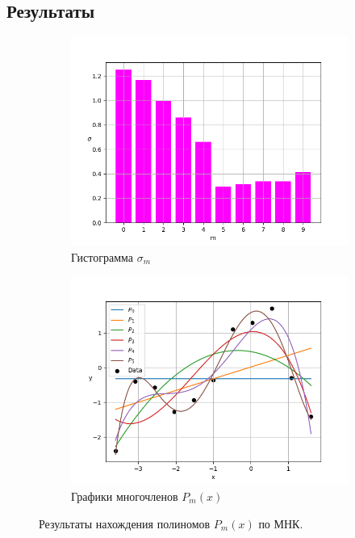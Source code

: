 \documentclass[12pt]{article}%
\begin{document}
\newpage
\subsection{Результаты}
\begin{figure}[!h]
\centering

\begin{subfigure}{0.49\textwidth}
    \includegraphics[width=\textwidth]{task1_hist.png}
    \caption{Гистограмма $\sigma_m$}
\end{subfigure}
\hfill
\begin{subfigure}{0.49\textwidth}
    \includegraphics[width=\textwidth]{task1_polynoms.png}
    \caption{Графики многочленов $P_m(x)$}
\end{subfigure}

\caption{Результаты нахождения полиномов $P_m(x)$ по МНК.}
\end{figure}
\end{document}
